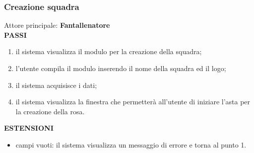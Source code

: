 \documentclass[12pt,a4paper]{article}
\begin{document}
\subsubsection{Creazione squadra}
Attore principale: \textbf{Fantallenatore}\\
\newline
\textbf{PASSI}
\begin{enumerate}
\item il sistema visualizza il modulo per la creazione della squadra;
\item l'utente compila il modulo inserendo il nome della squadra ed il logo;
\item il sistema acquisisce i dati;
\item il sistema visualizza la finestra che permetterà all'utente di iniziare l'asta per la creazione della rosa.
\end{enumerate}
\textbf{ESTENSIONI}
\begin{itemize}
\item campi vuoti: il sistema visualizza un messaggio di errore e torna al punto 1.
\end{itemize}
\end{document}
